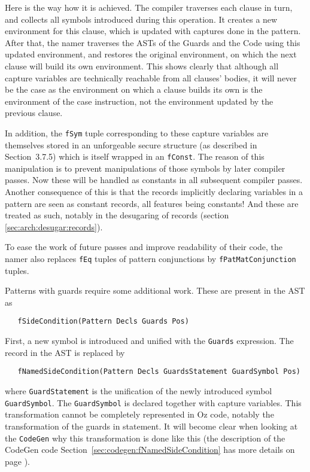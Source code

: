 \documentclass[a4paper]{memoir}
\begin{document}
Here is the way how it is achieved. The compiler traverses each clause in turn,
and collects all symbols introduced during this operation. It creates a new
environment for this clause, which is updated with captures done in the
pattern. After that, the namer traverses the ASTs of the Guards and the Code
using this updated environment, and restores the original environment, on which
the next clause will build its own environment. This shows clearly that
although all capture variables are technically reachable from all clauses'
bodies, it will never be the case as the environment on which a clause builds
its own is the environment of the case instruction, not the environment updated
by the previous clause. 

In addition, the \lstinline!fSym! tuple corresponding to these capture
variables are themselves stored in an unforgeable secure structure (as
described in \cite{CTMCP} Section~3.7.5) which is itself wrapped in an
\lstinline!fConst!. The reason of this manipulation is to prevent manipulations
of those symbols by later compiler passes. Now these will be handled as
constants in all subsequent compiler passes. Another consequence of this is
that the records implicitly declaring variables in a pattern are seen as
constant records, all features being constants! And these are treated as such,
notably in the desugaring of records (section \ref{sec:arch:desugar:records}).

To ease the work of future passes and improve readability of their code, the
namer also replaces \lstinline!fEq! tuples of pattern conjunctions by
\lstinline!fPatMatConjunction! tuples.

Patterns with guards require some additional work. These are present in the AST
as 
\begin{lstlisting}
   fSideCondition(Pattern Decls Guards Pos)
\end{lstlisting}
First, a new symbol is
introduced and unified with the \lstinline!Guards! expression. The record in the
AST is replaced by 
\begin{lstlisting}
   fNamedSideCondition(Pattern Decls GuardsStatement GuardSymbol Pos)
\end{lstlisting}
where \lstinline!GuardStatement! is the unification of the newly
introduced symbol \\\lstinline!GuardSymbol!. The \lstinline!GuardSymbol! is
declared together with capture variables. 
This transformation cannot be completely represented in Oz code, notably the
transformation of the guards in statement. It will become clear when looking at
the \lstinline!CodeGen! why this transformation is done like this (the
description of the CodeGen code Section~\ref{sec:codegen:fNamedSideCondition} has more
details on page \pageref{sec:codegen:fNamedSideCondition}).
\end{document}
